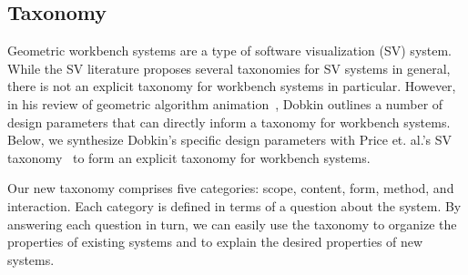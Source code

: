 \subsection{Taxonomy} 
\label{sec:taxonomy}



Geometric workbench systems are a type of software visualization (SV) system.
While the SV literature proposes several taxonomies for SV systems in general,
there is not an explicit taxonomy for workbench systems in particular. However,
in his review of geometric algorithm animation~\cite{hausner1999animation},
Dobkin outlines a number of design parameters that can directly inform a
taxonomy for workbench systems. Below, we synthesize Dobkin's specific design
parameters with Price et. al.'s SV taxonomy~\cite{price1993principled} to form
an explicit taxonomy for workbench systems. 

Our new taxonomy comprises five categories: scope, content, form, method, and
interaction. Each category is defined in terms of a question about the system.
By answering each question in turn, we can easily use the taxonomy to organize
the properties of existing systems and to explain the desired properties of new
systems.



